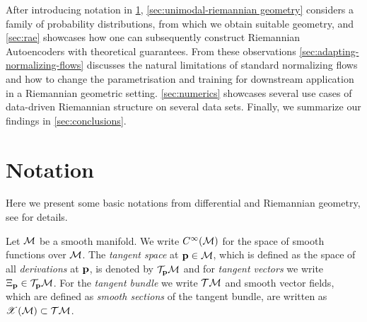 After introducing notation in \ref{sec:notation}, \ref{sec:unimodal-riemannian geometry} considers a family of probability distributions, from which we obtain suitable geometry, and \ref{sec:rae} showcases how one can subsequently construct Riemannian Autoencoders with theoretical guarantees. From these observations \ref{sec:adapting-normalizing-flows} discusses the natural limitations of standard normalizing flows and how to change the parametrisation and training for downstream application in a Riemannian geometric setting. \ref{sec:numerics} showcases several use cases of data-driven Riemannian structure on several data sets. Finally, we summarize our findings in \ref{sec:conclusions}.

\section{Notation}
\label{sec:notation}

Here we present some basic notations from differential and Riemannian geometry, see \cite{boothby2003introduction,carmo1992riemannian,lee2013smooth,sakai1996riemannian} for details. 

Let $\mathcal{M}$ be a smooth manifold. We write $C^\infty(\mathcal{M})$ for the space of smooth functions over $\mathcal{M}$. The \emph{tangent space} at $\mathbf{p} \in \mathcal{M}$, which is defined as the space of all \emph{derivations} at $\mathbf{p}$, is denoted by $\mathcal{T}_{\mathbf{p}} \mathcal{M}$ and for \emph{tangent vectors} we write $\Xi_{\mathbf{p}} \in \mathcal{T}_{\mathbf{p}} \mathcal{M}$. For the \emph{tangent bundle} we write $\mathcal{T}\mathcal{M}$ and smooth vector fields, which are defined as \emph{smooth sections} of the tangent bundle, are written as $\mathscr{X}(\mathcal{M}) \subset \mathcal{T}\mathcal{M}$.

